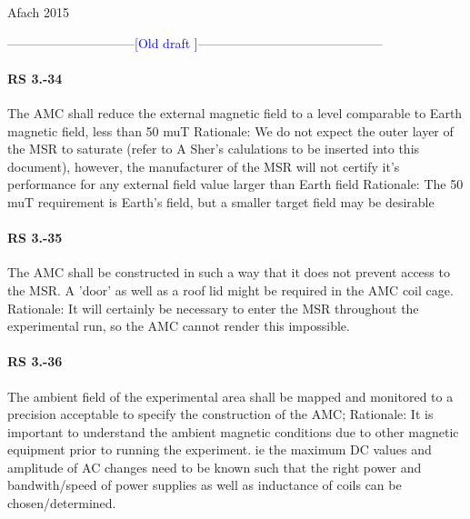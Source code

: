 \begin{thebibliography}{9}
Afach 2015

\end{thebibliography}


\begin{center}
\textcolor{blue}{
------------------------------[Old draft ]--------------------------------------------
}
\end{center}







\paragraph*{RS 3.-34}	The AMC shall reduce the external magnetic field to a level comparable to Earth magnetic field, less than 50 muT 
\newline Rationale: 	
We do not expect the outer layer of the MSR to saturate (refer to A Sher's calulations to be inserted into this document), however, the manufacturer of the MSR will not certify it's performance for any external field value larger than Earth field
\newline Rationale: 	The 50 muT requirement is Earth’s field, but a smaller target field may be desirable
\paragraph*{RS 3.-35}	The AMC shall be constructed in such a way that it does not prevent access to the MSR. A 'door' as well as a roof lid might be required in the AMC coil cage.
\newline Rationale: 	It will certainly be necessary to enter the MSR throughout the experimental run, so the AMC cannot render this impossible.
\paragraph*{RS 3.-36}	The ambient field of the experimental area shall be mapped and monitored to a precision acceptable to specify the construction of the AMC; 
\newline Rationale: 	It is important to understand the ambient magnetic conditions due to other magnetic equipment prior to running the experiment. ie the maximum DC values and amplitude of AC changes need to be known such that the right power and bandwith/speed of power supplies as well as inductance of coils can be chosen/determined.
